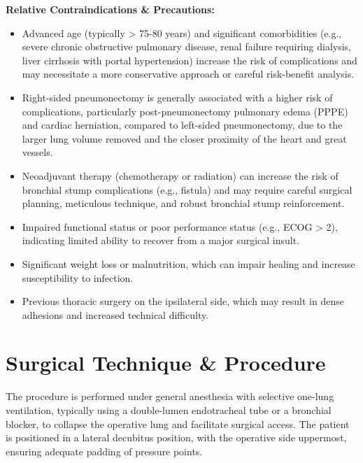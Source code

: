 \textbf{Relative Contraindications \& Precautions:}

\begin{itemize}
  \item Advanced age (typically > 75-80 years) and significant comorbidities (e.g., severe chronic obstructive pulmonary disease, renal failure requiring dialysis, liver cirrhosis with portal hypertension) increase the risk of complications and may necessitate a more conservative approach or careful risk-benefit analysis.
  
  \item Right-sided pneumonectomy is generally associated with a higher risk of complications, particularly post-pneumonectomy pulmonary edema (PPPE) and cardiac herniation, compared to left-sided pneumonectomy, due to the larger lung volume removed and the closer proximity of the heart and great vessels.
  
  \item Neoadjuvant therapy (chemotherapy or radiation) can increase the risk of bronchial stump complications (e.g., fistula) and may require careful surgical planning, meticulous technique, and robust bronchial stump reinforcement.
  
  \item Impaired functional status or poor performance status (e.g., ECOG > 2), indicating limited ability to recover from a major surgical insult.
  
  \item Significant weight loss or malnutrition, which can impair healing and increase susceptibility to infection.
  
  \item Previous thoracic surgery on the ipsilateral side, which may result in dense adhesions and increased technical difficulty.
\end{itemize}

\section*{Surgical Technique \& Procedure}
The procedure is performed under general anesthesia with selective one-lung ventilation, typically using a double-lumen endotracheal tube or a bronchial blocker, to collapse the operative lung and facilitate surgical access. The patient is positioned in a lateral decubitus position, with the operative side uppermost, ensuring adequate padding of pressure points.

